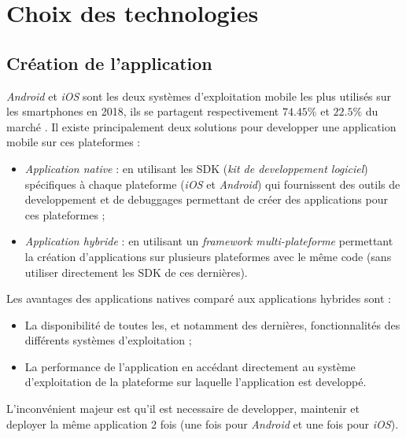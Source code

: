 \section{Choix des technologies}

\subsection{Création de l'application}

\textit{Android} et \textit{iOS} sont les deux systèmes d'exploitation mobile les plus utilisés sur les smartphones en 2018, ils se partagent respectivement $74.45\%$ et $22.5\%$ du marché \cite{market_share}. Il existe principalement deux solutions pour developper une application mobile sur ces plateformes :

\begin{itemize}
  \item \textit{Application native} : en utilisant les SDK (\textit{kit de developpement logiciel}) spécifiques à chaque plateforme (\textit{iOS} et \textit{Android}) qui fournissent des outils de developpement et de debuggages permettant de créer des applications pour ces plateformes ;
  \item \textit{Application hybride} : en utilisant un \textit{framework multi-plateforme} permettant la création d'applications sur plusieurs plateformes avec le même code (sans utiliser directement les SDK de ces dernières).
\end{itemize}

Les avantages des applications natives comparé aux applications hybrides sont :

\begin{itemize}
  \item La disponibilité de toutes les, et notamment des dernières, fonctionnalités des différents systèmes d'exploitation ;
  \item La performance de l'application en accédant directement au système d'exploitation de la plateforme sur laquelle l'application est developpé.
\end{itemize}

L'inconvénient majeur est qu'il est necessaire de developper, maintenir et deployer la même application 2 fois (une fois pour \textit{Android} et une fois pour \textit{iOS}).

